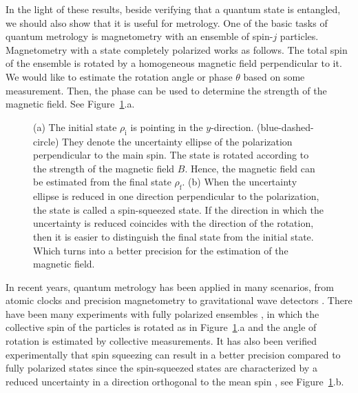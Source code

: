 In the light of these results, beside verifying that a quantum state is entangled, we should also show that it is useful for metrology.
One of the basic tasks of quantum metrology is magnetometry with an ensemble of spin-$j$ particles.
Magnetometry with a state completely polarized works as follows.
The total spin of the ensemble is rotated by a homogeneous magnetic field perpendicular to it.
We would like to estimate the rotation angle or phase $\theta$ based on some measurement.
Then, the phase can be used to determine the strength of the magnetic field.
See Figure~\ref{fig:int-magnetometry-totally-polarized}.a.
\begin{figure}[htp]
  \centering
  \caption[How spin-squeezed states improve the precision]{(a) The initial state $\rho_{\text{i}}$ is pointing in the $y$-direction.
  (blue-dashed-circle) They denote the uncertainty ellipse of the polarization perpendicular to the main spin.
  The state is rotated according to the strength of the magnetic field $B$.
  Hence, the magnetic field can be estimated from the final state $\rho_{\text{f}}$.
  (b) When the uncertainty ellipse is reduced in one direction perpendicular to the polarization, the state is called a spin-squeezed state.
  If the direction in which the uncertainty is reduced coincides with the direction of the rotation, then it is easier to distinguish the final state from the initial state.
  Which turns into a better precision for the estimation of the magnetic field.}
  \label{fig:int-magnetometry-totally-polarized}
\end{figure}

In recent years, quantum metrology has been applied in many scenarios, from atomic clocks \citep{Louchet-Chauvet2010, Borregaard2013, Kessler2014a} and precision magnetometry \citep{Wasilewski2010, Eckert2006, Wildermuth2006, Wolfgramm2010, Koschorreck2011, Vengalattore2007, Zhou2010} to gravitational wave detectors \citep{Schnabel2010, TheLIGOScientificCollaboration2011, Demkowicz-Dobrzanski2013}.
There have been many experiments with fully polarized ensembles \citep{Gross2012, Wasilewski2010, Wildermuth2006, Vengalattore2007, Behbood2013, Koschorreck2011, Muessel2014}, in which the collective spin of the particles is rotated as in Figure~\ref{fig:int-magnetometry-totally-polarized}.a and the angle of rotation is estimated by collective measurements.
It has also been verified experimentally that spin squeezing can result in a better precision compared to fully polarized states \citep{Riedel2010, Gross2012, Wasilewski2010, Muessel2014, Fernholz2008, Hald1999, Julsgaard2001, Hammerer2010, Esteve2008} since the spin-squeezed states are characterized by a reduced uncertainty in a direction orthogonal to the mean spin \citep{Kitagawa1993, Wineland1994, Sorensen2001, Ma2011}, see Figure~\ref{fig:int-magnetometry-totally-polarized}.b.

